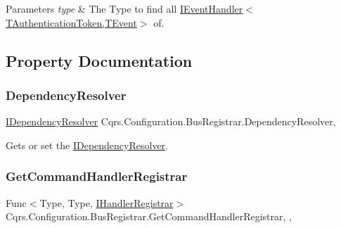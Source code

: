 \begin{DoxyParams}{Parameters}
{\em type} & The Type to find all \hyperlink{interfaceCqrs_1_1Events_1_1IEventHandler}{I\+Event\+Handler$<$\+T\+Authentication\+Token,\+T\+Event$>$} of.\\
\hline
\end{DoxyParams}


\subsection{Property Documentation}
\mbox{\label{classCqrs_1_1Configuration_1_1BusRegistrar_aafccd565c2d9a748ff0f850a94100399_aafccd565c2d9a748ff0f850a94100399}} 
\subsubsection{\texorpdfstring{Dependency\+Resolver}{DependencyResolver}}
{\footnotesize\ttfamily \hyperlink{interfaceCqrs_1_1Configuration_1_1IDependencyResolver}{I\+Dependency\+Resolver} Cqrs.\+Configuration.\+Bus\+Registrar.\+Dependency\+Resolver\hspace{0.3cm}{\ttfamily [get]}, {\ttfamily [protected]}}



Gets or set the \hyperlink{interfaceCqrs_1_1Configuration_1_1IDependencyResolver}{I\+Dependency\+Resolver}. 

\mbox{\label{classCqrs_1_1Configuration_1_1BusRegistrar_a5ac56d73af9d550c70ee722daed7dce8_a5ac56d73af9d550c70ee722daed7dce8}} 
\subsubsection{\texorpdfstring{Get\+Command\+Handler\+Registrar}{GetCommandHandlerRegistrar}}
{\footnotesize\ttfamily Func$<$Type, Type, \hyperlink{interfaceCqrs_1_1Bus_1_1IHandlerRegistrar}{I\+Handler\+Registrar}$>$ Cqrs.\+Configuration.\+Bus\+Registrar.\+Get\+Command\+Handler\+Registrar\hspace{0.3cm}{\ttfamily [static]}, {\ttfamily [get]}, {\ttfamily [set]}}



